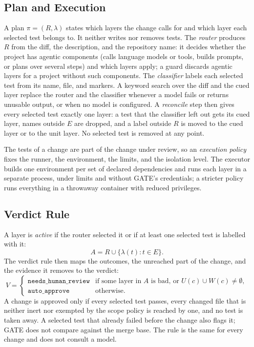 \documentclass[conference]{IEEEtran}
\begin{document}
\subsection{Plan and Execution}\label{plan-and-execution}

A plan \(\pi = (R, \lambda)\) states which layers the change calls for and which layer each selected test belongs to. It neither writes nor removes tests. The \emph{router} produces \(R\) from the diff, the description, and the repository name: it decides whether the project has agentic components (calls language models or tools, builds prompts, or plans over several steps) and which layers apply; a guard discards agentic layers for a project without such components. The \emph{classifier} labels each selected test from its name, file, and markers. A keyword search over the diff and the cued layer replace the router and the classifier whenever a model fails or returns unusable output, or when no model is configured. A \emph{reconcile} step then gives every selected test exactly one layer: a test that the classifier left out gets its cued layer, names outside \(E\) are dropped, and a label outside \(R\) is moved to the cued layer or to the unit layer. No selected test is removed at any point.

The tests of a change are part of the change under review, so an \emph{execution policy} fixes the runner, the environment, the limits, and the isolation level. The executor builds one environment per set of declared dependencies and runs each layer in a separate process, under limits and without GATE's credentials; a stricter policy runs everything in a throwaway container with reduced privileges.

\subsection{Verdict Rule}\label{verdict-rule}

A layer is \emph{active} if the router selected it or if at least one selected test is labelled with it: \[A = R \cup \{\lambda(t) : t \in E\}.\] The verdict rule then maps the outcomes, the unreached part of the change, and the evidence it removes to the verdict: \[V = \begin{cases} \texttt{needs\_human\_review} & \text{if some layer in } A \text{ is bad, or } U(c) \cup W(c) \neq \emptyset,\\ \texttt{auto\_approve} & \text{otherwise.}\end{cases}\] A change is approved only if every selected test passes, every changed file that is neither inert nor exempted by the scope policy is reached by one, and no test is taken away. A selected test that already failed before the change also flags it; GATE does not compare against the merge base. The rule is the same for every change and does not consult a model.
\end{document}
